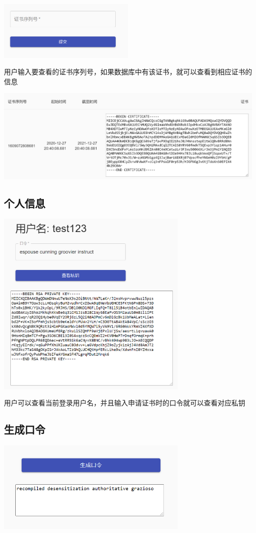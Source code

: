 \documentclass{ctexart}
\begin{document}
\includegraphics[width=0.5\textwidth]{Clipboard_2021-01-01-15-09-41.png}

用户输入要查看的证书序列号，如果数据库中有该证书，就可以查看到相应证书的信息

\includegraphics[width=\textwidth]{Clipboard_2021-01-01-15-11-13.png}
\subsection{个人信息}

\includegraphics[width=0.7\textwidth]{Clipboard_2021-01-01-15-14-26.png}

用户可以查看当前登录用户名，并且输入申请证书时的口令就可以查看对应私钥
\subsection{生成口令}

\includegraphics[width=0.7\textwidth]{Clipboard_2021-01-01-15-20-14.png}
\end{document}
